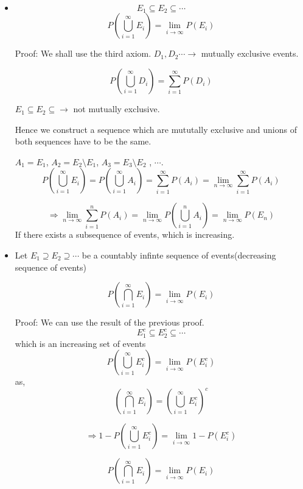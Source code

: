 \documentclass{article}
\begin{document}
\begin{itemize}
    \item $$E_1 \subseteq E_2 \subseteq \cdots$$
    $$P(\bigcup_{i=1}^{\infty} E_i)= \lim_{i \to \infty} P(E_i)$$

    Proof:
    We shall use the third axiom.
    $D_1, D_2 \cdots \rightarrow$ mutually exclusive events.

    $$ P(\bigcup_{i=1}^{\infty} D_i)= \sum_{i=1}^{\infty}P(D_i)$$

    $E_1 \subseteq E_2 \subseteq \rightarrow $ not mutually exclusive.

    Hence we construct a sequence which are mututally exclusive and unions of both sequences have to be the same.

    $A_1=E_1$, $A_2=E_2\setminus E_1$, $ A_3=E_3 \setminus E_2$ , $\cdots$.
    $$ P(\bigcup_{i=1}^{\infty} E_i)= P(\bigcup_{i=1}^{\infty} A_i)= \sum_{i=1}^{\infty}P(A_i)= \lim_{n \to \infty} \sum_{i=1}^{\infty}P(A_i)$$

    $$\Rightarrow \lim_{n \to \infty} \sum_{i=1}^{n} P(A_i)= \lim_{n \to \infty} P(\bigcup_{i=1}^{n}A_i)= \lim_{n \to \infty}P(E_n)$$
    If there exists a subsequence of events, which is increasing.

    \item Let $E_1 \supseteq E_2 \supseteq \cdots$ be a countably infinte sequence of events(decreasing sequence of events)

    $$P(\bigcap_{i=1}^{\infty}E_i)=\lim_{i \to \infty} P(E_i)$$

    Proof: We can use the result of the previous proof.
    $$ E_1^c \subseteq E_2^c \subseteq \cdots$$
    which is an increasing set of events
    $$P(\bigcup_{i=1}^{\infty} E_i^c)= \lim_{i \to \infty}P(E_i^c)$$
    as,
    $$ \left(\bigcap_{i=1}^{\infty} E_i \right)= \left( \bigcup_{i=1}^{\infty} E_i^c \right)^c $$

    $$\Rightarrow 1- P(\bigcup_{i=1}^{\infty} E_i^c)= \lim_{i \to \infty}1- P(E_i^c)$$

    $$P \left(\bigcap_{i=1}^{\infty} E_i \right) = \lim_{i \to \infty }P(E_i)$$


\end{itemize}


\end{document}
